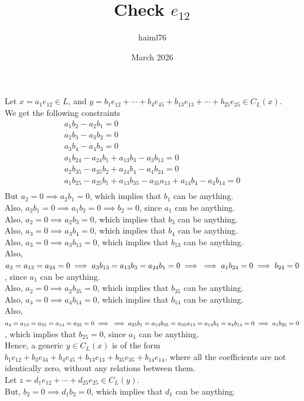 \documentclass{article}
\title{Check $e_{12}$}
\author{haiml76 }
\date{March 2026}
\begin{document}
Let $x=a_1e_{12}\in{L}$, and $y=b_1e_{12}+\cdots+b_4e_{45}+b_{13}e_{13}+\cdots+b_{25}e_{25}\in{C}_L(x)$.\\
We get the following constraints\\
\begin{align*}
a_1b_2-a_2b_1=0\\
a_2b_3-a_3b_2=0\\
a_3b_4-a_4b_3=0\\
a_1b_{24}-a_{24}b_1+a_{13}b_3-a_3b_{13}=0\\
a_2b_{35}-a_{35}b_2+a_{24}b_4-a_4b_{24}=0\\
a_1b_{25}-a_{25}b_1+a_{13}b_{35}-a_{35}a_{13}+a_{14}b_4-a_4b_{14}=0\\
\end{align*}
But $a_2=0\implies{a_2b_1=0}$, which implies that $b_1$ can be anything.\\
Also,
$a_2b_1=0\implies{a_1b_2=0}\implies{b_2=0}$, since $a_1$ can be anything.\\
Also,
$a_2=0\implies{a_2b_3=0}$, which implies that $b_3$ can be anything.\\
Also, 
$a_3=0\implies{a_3b_4=0}$, which implies that $b_4$ can be anything.\\
Also,
$a_3=0\implies{
a_3b_{13}}=0$, which implies that $b_{13}$ can be anything.\\
Also,
$a_3=a_{13}=a_{24}=0\implies{a_3b_{13}=a_{13}b_3=a_{24}b_1=0}\implies\\\implies{a_1b_{24}=0}\implies{b_{24}=0}$, since $a_1$ can be anything.\\
Also,
$a_2=0\implies{a_2b_{35}=0}$, which implies that $b_{35}$ can be anything.\\
Also,
$a_4=0\implies{a_4b_{14}=0}$, which implies that $b_{14}$ can be anything.\\
Also,
$a_4=a_{13}=a_{35}=a_{14}=a_{25}=0\implies\\\implies{a_{25}b_1=a_{13}b_{35}=a_{35}a_{13}=a_{14}b_4=a_4b_{14}=0}\implies{a_1b_{25}=0}$, which implies that $b_{25}=0$, since $a_1$ can be anything.\\
Hence, a generic $y\in{C}_L(x)$ is of the form\\
$b_1e_{12}+b_3e_{34}+b_4e_{45}+b_{13}e_{13}+b_{35}e_{35}+b_{14}e_{14}$, where all the coefficients are not identically zero, without any relations between them.\\
Let $z=d_1e_{12}+\cdots+d_{25}e_{25}\in{C}_L(y)$.\\
But,
$b_2=0\implies{d_1b_2=0}$, which implies that $d_1$ can be anything.\\
\end{document}

